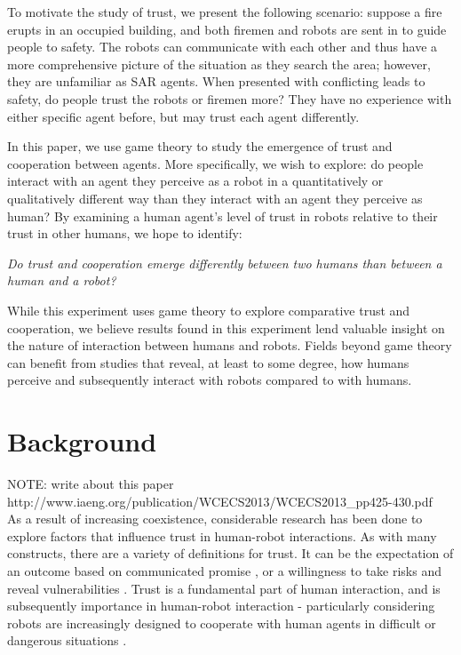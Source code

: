 \documentclass{sig-alternate}
\begin{document}
To motivate the study of trust, we present the following scenario: suppose a fire erupts in an occupied building, and both firemen and robots are sent in to guide people to safety. The robots can communicate with each other and thus have a more comprehensive picture of the situation as they search the area; however, they are unfamiliar as SAR agents. When presented with conflicting leads to safety, do people trust the robots or firemen more? They have no experience with either specific agent before, but may trust each agent differently.

In this paper, we use game theory to study the emergence of trust and cooperation between agents. More specifically, we wish to explore: do people interact with an agent they perceive as a robot in a quantitatively or qualitatively different way than they interact with an agent they perceive as human? By examining a human agent's level of trust in robots relative to their trust in other humans, we hope to identify:

\indent \textit{Do trust and cooperation emerge differently between two humans than between a human and a robot?}

While this experiment uses game theory to explore comparative trust and cooperation, we believe results found in this experiment lend valuable insight on the nature of interaction between humans and robots. Fields beyond game theory can benefit from studies that reveal, at least to some degree, how humans perceive and subsequently interact with robots compared to with humans.

\section{Background}

NOTE: write about this paper http://www.iaeng.org/publication/WCECS2013/WCECS2013_pp425-430.pdf\\

As a result of increasing coexistence, considerable research has been done to explore factors that influence trust in human-robot interactions. As with many constructs, there are a variety of definitions for trust. It can be the expectation of an outcome based on communicated promise \cite{rotter1967new}, or a willingness to take risks and reveal vulnerabilities \cite{lee2004trust}. Trust is a fundamental part of human interaction, and is subsequently importance in human-robot interaction - particularly considering robots are increasingly designed to cooperate with human agents in difficult or dangerous situations \cite{casper2003human}.
\end{document}
